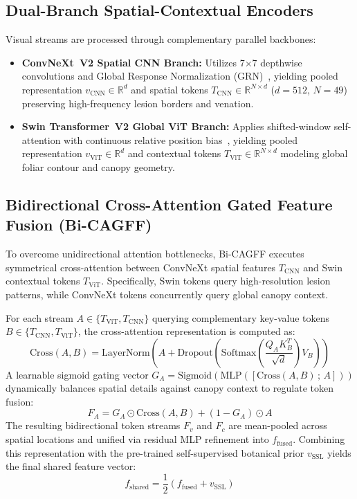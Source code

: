 \documentclass[runningheads]{llncs}
\begin{document}
\subsection{Dual-Branch Spatial-Contextual Encoders}
Visual streams are processed through complementary parallel backbones:
\begin{itemize}
    \item \textbf{ConvNeXt~V2 Spatial CNN Branch:} Utilizes 7$\times$7 depthwise convolutions and Global Response Normalization (GRN)~\cite{ref_deshpande2024,ref_garg2026}, yielding pooled representation $v_{\text{CNN}} \in \mathbb{R}^{d}$ and spatial tokens $T_{\text{CNN}} \in \mathbb{R}^{N \times d}$ ($d=512$, $N=49$) preserving high-frequency lesion borders and venation.
    \item \textbf{Swin Transformer~V2 Global ViT Branch:} Applies shifted-window self-attention with continuous relative position bias~\cite{ref_tonmoy2025}, yielding pooled representation $v_{\text{ViT}} \in \mathbb{R}^{d}$ and contextual tokens $T_{\text{ViT}} \in \mathbb{R}^{N \times d}$ modeling global foliar contour and canopy geometry.
\end{itemize}

\subsection{Bidirectional Cross-Attention Gated Feature Fusion (Bi-CAGFF)}
To overcome unidirectional attention bottlenecks, Bi-CAGFF executes symmetrical cross-attention between ConvNeXt spatial features $T_{\text{CNN}}$ and Swin contextual tokens $T_{\text{ViT}}$. Specifically, Swin tokens query high-resolution lesion patterns, while ConvNeXt tokens concurrently query global canopy context.

For each stream $A \in \{T_{\text{ViT}}, T_{\text{CNN}}\}$ querying complementary key-value tokens $B \in \{T_{\text{CNN}}, T_{\text{ViT}}\}$, the cross-attention representation is computed as:
\begin{equation}
\text{Cross}(A, B) = \text{LayerNorm}\left(A + \text{Dropout}\left(\text{Softmax}\left(\frac{Q_A K_B^T}{\sqrt{d}}\right) V_B\right)\right)
\end{equation}
A learnable sigmoid gating vector $G_A = \text{Sigmoid}(\text{MLP}([\text{Cross}(A, B) \, ; \, A]))$ dynamically balances spatial details against canopy context to regulate token fusion:
\begin{equation}
F_A = G_A \odot \text{Cross}(A, B) + (1 - G_A) \odot A
\end{equation}
The resulting bidirectional token streams $F_v$ and $F_c$ are mean-pooled across spatial locations and unified via residual MLP refinement into $f_{\text{fused}}$. Combining this representation with the pre-trained self-supervised botanical prior $v_{\text{SSL}}$ yields the final shared feature vector:
\begin{equation}
f_{\text{shared}} = \frac{1}{2} \left( f_{\text{fused}} + v_{\text{SSL}} \right)
\end{equation}
\end{document}

